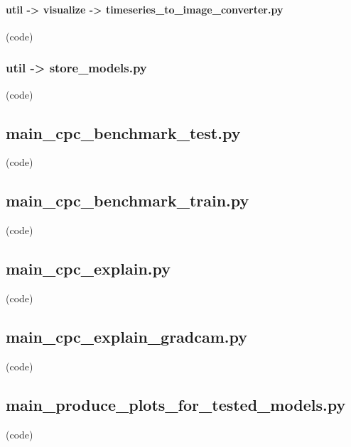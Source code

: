 \begin{myparindent}{0pt}

\noindent\paragraph[timeseries\_to\_image\_converter.py]{util -> visualize -> timeseries\_to\_image\_converter.py} (code)

\noindent\subsubsection[store\_models.py]{util -> store\_models.py} (code)

\noindent\subsection[main\_cpc\_benchmark\_test.py]{main\_cpc\_benchmark\_test.py} (code)

\noindent\subsection[main\_cpc\_benchmark\_train.py]{main\_cpc\_benchmark\_train.py} (code)

\noindent\subsection[main\_cpc\_explain.py]{main\_cpc\_explain.py} (code)

\noindent\subsection[main\_cpc\_explain\_gradcam.py]{main\_cpc\_explain\_gradcam.py} (code)

\noindent\subsection[main\_produce\_plots\_for\_tested\_models.py]{main\_produce\_plots\_for\_tested\_models.py} (code)

\end{myparindent}
\endgroup